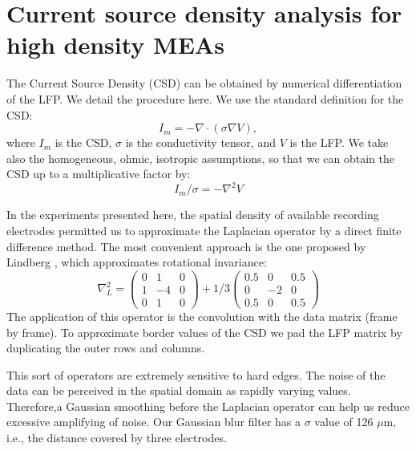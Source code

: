 \documentclass{article}
\begin{document}
\section{Current source density analysis for high density MEAs}

The Current Source Density (CSD) can be obtained
by numerical differentiation of the LFP. We detail the procedure here.
We use the standard definition for the CSD:
\begin{equation}
  I_m = -\nabla\cdot(\sigma\nabla V),
\end{equation}
where $I_m$ is the CSD, $\sigma$ is the conductivity tensor, and $V$ is the LFP. We take
also the homogeneous, ohmic, isotropic assumptions, so that we can obtain
 the CSD up to a multiplicative factor by:
\begin{equation}
  I_m/\sigma=-\nabla^2 V
\end{equation}

In the experiments presented here, the spatial density of available recording electrodes
permitted us to approximate the Laplacian operator by a direct finite difference
method. The most convenient approach is the one proposed by Lindberg \cite{Lindberg90},
which approximates rotational invariance:
\begin{equation}
  \nabla^2_{L}=\begin{pmatrix}
  0 & 1 & 0 \\
  1 & -4 & 0 \\
  0 & 1 & 0
\end{pmatrix}
+1/3
\begin{pmatrix}
  0.5 & 0 & 0.5 \\
  0 & -2 & 0 \\
  0.5 & 0 & 0.5
\end{pmatrix}
\end{equation}
The application of this operator is the convolution with the data matrix (frame by frame). To
approximate border values of the CSD we pad the LFP matrix  by duplicating the outer rows and columns. 

This sort of operators are extremely sensitive to hard edges. The  noise of the data can be perceived in the spatial domain as rapidly varying values. Therefore,a Gaussian smoothing before the Laplacian operator can help us reduce excessive amplifying of noise. Our Gaussian blur filter has a $\sigma$ value of 126 $\mu$m, i.e., the distance covered by three electrodes.
\end{document}
